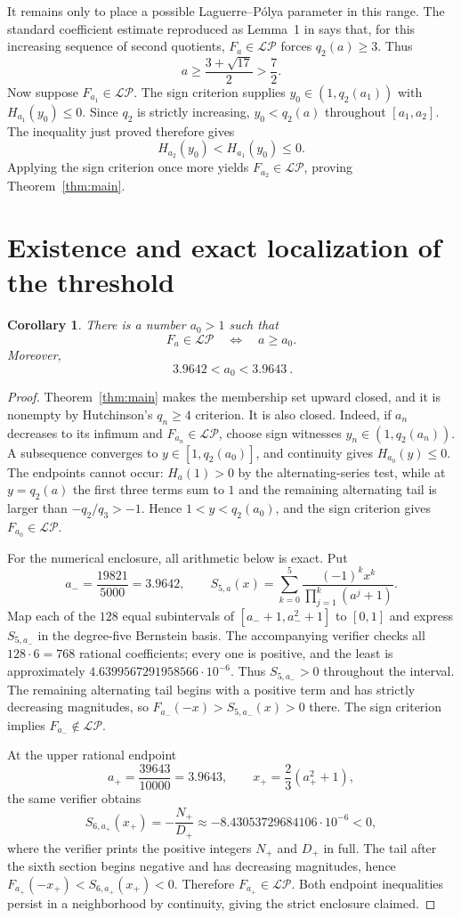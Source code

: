 \documentclass[11pt]{article}
\newtheorem{corollary}[theorem]{Corollary}
\newcommand{\LP}{\mathcal{L\!P}}
\begin{document}
It remains only to place a possible Laguerre--P\'olya parameter in this
range.  The standard coefficient estimate reproduced as Lemma~1 in
\cite{Nguyen} says that, for this increasing sequence of second quotients,
$F_a\in\LP$ forces $q_2(a)\geq3$.  Thus
\[
 a\geq\frac{3+\sqrt{17}}2>\frac72.
\]
Now suppose $F_{a_1}\in\LP$.  The sign criterion supplies
$y_0\in(1,q_2(a_1))$ with $H_{a_1}(y_0)\leq0$.  Since $q_2$ is strictly
increasing, $y_0<q_2(a)$ throughout $[a_1,a_2]$.  The inequality just proved
therefore gives
\[
 H_{a_2}(y_0)<H_{a_1}(y_0)\leq0.
\]
Applying the sign criterion once more yields $F_{a_2}\in\LP$, proving
Theorem~\ref{thm:main}.

\section{Existence and exact localization of the threshold}

\begin{corollary}\label{cor:threshold}
There is a number $a_0>1$ such that
\[
 F_a\in\LP\quad\Longleftrightarrow\quad a\geq a_0.
\]
Moreover,
\[
 \boxed{\ 3.9642<a_0<3.9643\ }.
\]
\end{corollary}

\begin{proof}
Theorem~\ref{thm:main} makes the membership set upward closed, and it is
nonempty by Hutchinson's $q_n\geq4$ criterion.  It is also closed.  Indeed,
if $a_n$ decreases to its infimum and $F_{a_n}\in\LP$, choose sign witnesses
$y_n\in(1,q_2(a_n))$.  A subsequence converges to
$y\in[1,q_2(a_0)]$, and continuity gives $H_{a_0}(y)\leq0$.  The endpoints
cannot occur: $H_a(1)>0$ by the alternating-series test, while at
$y=q_2(a)$ the first three terms sum to $1$ and the remaining alternating
tail is larger than $-q_2/q_3>-1$.  Hence $1<y<q_2(a_0)$, and the sign
criterion gives $F_{a_0}\in\LP$.

For the numerical enclosure, all arithmetic below is exact.  Put
\[
 a_- =\frac{19821}{5000}=3.9642,
 \qquad S_{5,a}(x)=\sum_{k=0}^5
 \frac{(-1)^kx^k}{\prod_{j=1}^k(a^j+1)}.
\]
Map each of the $128$ equal subintervals of
$[a_-+1,a_-^2+1]$ to $[0,1]$ and express $S_{5,a_-}$ in the degree-five
Bernstein basis.  The accompanying verifier checks all $128\cdot6=768$
rational coefficients; every one is positive, and the least is approximately
$4.6399567291958566\cdot10^{-6}$.  Thus $S_{5,a_-}>0$ throughout the
interval.  The remaining alternating tail begins with a positive term and
has strictly decreasing magnitudes, so $F_{a_-}(-x)>S_{5,a_-}(x)>0$ there.
The sign criterion implies $F_{a_-}\notin\LP$.

At the upper rational endpoint
\[
 a_+=\frac{39643}{10000}=3.9643,
 \qquad x_+=\frac23(a_+^2+1),
\]
the same verifier obtains
\[
 S_{6,a_+}(x_+)=-\frac{N_+}{D_+}
 \approx-8.43053729684106\cdot10^{-6}<0,
\]
where the verifier prints the positive integers $N_+$ and $D_+$ in full.
The tail after the sixth section begins negative and has decreasing
magnitudes, hence $F_{a_+}(-x_+)<S_{6,a_+}(x_+)<0$.  Therefore
$F_{a_+}\in\LP$.  Both endpoint inequalities persist in a neighborhood by
continuity, giving the strict enclosure claimed.
\end{proof}
\end{document}
